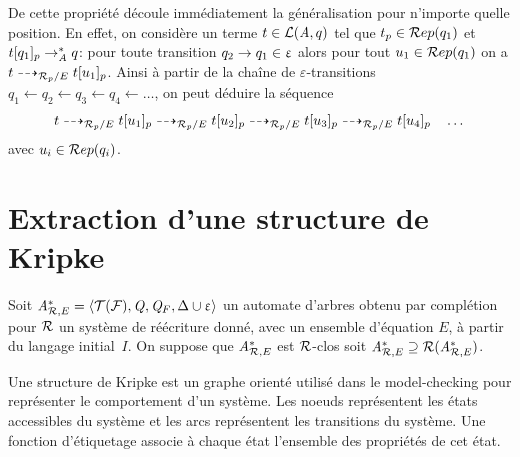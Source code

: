 \newcommand{\wrsav}{\wr}
\renewcommand{\wr}{\leftarrow}
  De cette propriété découle immédiatement la généralisation pour n'importe quelle position.
  En effet, on considère un terme $t \in \mathcal{L}(\mathit A, q)$ tel que $t_p \in \mathcal R ep(q_1)$ et $t[q_1]_p \rightarrow_\mathit A^* q$:
  pour toute transition $q_2 \rightarrow q_1\in \upvarepsilon$ alors pour tout $u_1 \in \mathcal R ep(q_1)$ on a $t \dashrightarrow_{\mathcal R_p/E} t[u_1]_p$.
  Ainsi à partir de la chaîne de $\varepsilon$-transitions $q_1 \wr q_2 \wr q_3 \wr q_4 \wr \dots$,
  on peut déduire la séquence
  \[t \dashrightarrow_{\mathcal R_p/E} t[u_1]_p \dashrightarrow_{\mathcal R_p/E} t[u_2]_p \dashrightarrow_{\mathcal R_p/E} t[u_3]_p \dashrightarrow_{\mathcal R_p/E} t[u_4]_p \quad \dots\]
  \noindent avec $u_i \in \mathcal R ep(q_i)$.
\renewcommand{\wr}{\wrsav}





\section{Extraction d'une structure de Kripke}
Soit ${\mathit A}_{\mathcal R,E}^*= \langle \mathcal T(\mathcal{F}), \mathit Q, \mathit Q_F, \Delta \cup \upvarepsilon \rangle$ un automate d'arbres obtenu par 
complétion pour $\mathcal R$ un système de réécriture donné, avec un ensemble d'équation $E$, à partir 
du langage initial~$I$. On suppose que ${\mathit A}_{\mathcal R,E}^*$ est $\mathcal R$-clos soit ${\mathit A}_{\mathcal R,E}^* \supseteq \mathcal R({\mathit A}_{\mathcal R,E}^*)$.

Une structure de Kripke est un graphe orienté utilisé dans le model-checking pour représenter le comportement d'un système. 
Les noeuds représentent les états accessibles du système et les arcs représentent les transitions du système.
Une fonction d'étiquetage associe à chaque état l'ensemble des propriétés de cet état. 

